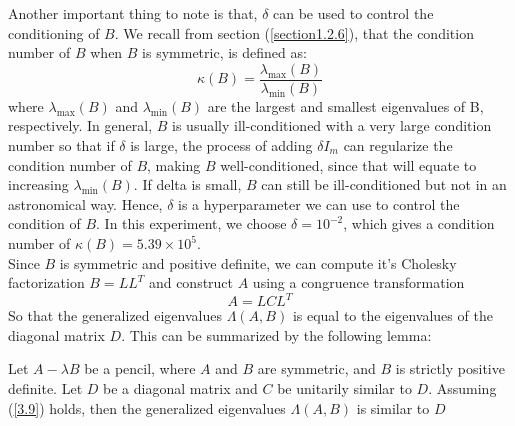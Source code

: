 Another important thing to note is that, $\delta$ can be used to control the conditioning of $B$. We recall from section (\ref{section1.2.6}), that the condition number of $B$ when $B$ is symmetric, is defined as:
\begin{equation}
	\kappa(B) = \frac{\lambda_{\max}(B)}{\lambda_{\min}(B)}
\end{equation}
where $\lambda_{\max}(B)$ and $\lambda_{\min}(B)$ are the largest and smallest eigenvalues of B, respectively.
In general, $B$ is usually ill-conditioned with a very large condition number so that if $\delta$ is large, the process of adding $\delta I_m$ can regularize the condition number of $B$, making $B$ well-conditioned, since that will equate to increasing $\lambda_{\min}(B)$. If delta is small, $B$ can still be ill-conditioned but not in an astronomical way. Hence, $\delta$ is a hyperparameter we can use to control the condition of $B$. In this experiment, we choose $\delta = 10^{-2}$, which gives a condition number of $\kappa(B) = 5.39 \times 10^5$.\\
Since $B$ is symmetric and positive definite, we can compute it's Cholesky factorization $B = LL^T$ and construct $A$ using a congruence transformation
\begin{equation}\label{3.9}
	A = LCL^T
\end{equation}
So that the generalized eigenvalues $\Lambda(A, B)$ is equal to the eigenvalues of the diagonal matrix $D$. This can be summarized by the following lemma:
\begin{lemma}
	Let $A-\lambda B$ be a pencil, where $A$ and $B$ are symmetric, and $B$ is strictly positive definite. Let $D$ be a diagonal matrix and $C$ be unitarily similar to $D$. Assuming (\ref{3.9}) holds, then the generalized eigenvalues $\Lambda(A, B)$ is similar to $D$
\end{lemma}

